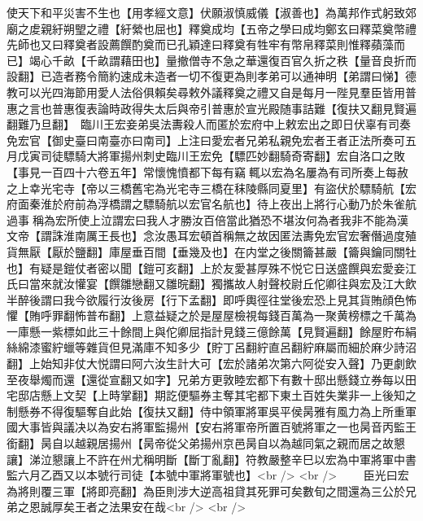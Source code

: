 使天下和平災害不生也【用孝經文意】伏願淑慎威儀【淑善也】為萬邦作式躬致郊廟之䖍親紆朔朢之禮【紆縈也屈也】釋奠成均【五帝之學曰成均鄭玄曰釋菜奠幣禮先師也又曰釋奠者設薦饌酌奠而已孔穎達曰釋奠有牲牢有幣帛釋菜則惟釋蘋藻而已】竭心千畝【千畝謂藉田也】量撤僧寺不急之華還復百官久折之秩【量音良折而設翻】已造者務令簡約速成未造者一切不復更為則孝弟可以通神明【弟謂曰悌】德教可以光四海節用愛人法俗俱賴矣尋敕外議釋奠之禮又自是每月一陛見羣臣皆用普惠之言也普惠復表論時政得失太后與帝引普惠於宣光殿随事詰難【復扶又翻見賢遍翻難乃旦翻】　臨川王宏妾弟吳法夀殺人而匿於宏府中上敕宏出之即日伏辜有司奏免宏官【御史臺曰南臺亦曰南司】上注曰愛宏者兄弟私親免宏者王者正法所奏可五月戊寅司徒驃騎大將軍揚州刺史臨川王宏免【驃匹妙翻騎奇寄翻】宏自洛口之敗【事見一百四十六卷五年】常懷愧憤都下每有竊輒以宏為名屢為有司所奏上每赦之上幸光宅寺【帝以三橋舊宅為光宅寺三橋在秣陵縣同夏里】有盜伏於驃騎航【宏府面秦淮於府前為浮橋謂之驃騎航以宏官名航也】待上夜出上將行心動乃於朱雀航過事稱為宏所使上泣謂宏曰我人才勝汝百倍當此猶恐不堪汝何為者我非不能為漢文帝【謂誅淮南厲王長也】念汝愚耳宏頓首稱無之故因匿法夀免宏官宏奢僭過度殖貨無厭【厭於鹽翻】庫屋垂百間【垂幾及也】在内堂之後關籥甚嚴【籥與鑰同關牡也】有疑是鎧仗者密以聞【鎧可亥翻】上於友愛甚厚殊不悦它日送盛饌與宏愛妾江氏曰當來就汝懽宴【饌雛戀翻又雛晥翻】獨攜故人射聲校尉丘佗卿往與宏及江大飲半醉後謂曰我今欲履行汝後房【行下孟翻】即呼輿徑往堂後宏恐上見其貨賄顔色怖懼【賄呼罪翻怖普布翻】上意益疑之於是屋屋檢視每錢百萬為一聚黄榜標之千萬為一庫懸一紫標如此三十餘間上與佗卿屈指計見錢三億餘萬【見賢遍翻】餘屋貯布絹絲綿漆蜜紵蠟等雜貨但見滿庫不知多少【貯丁呂翻紵直呂翻紵麻屬而細於麻少詩沼翻】上始知非仗大悦謂曰阿六汝生計大可【宏於諸弟次第六阿從安入聲】乃更劇飲至夜舉燭而還【還從宣翻又如字】兄弟方更敦睦宏都下有數十邸出懸錢立券每以田宅邸店懸上文契【上時掌翻】期訖便驅券主奪其宅都下東土百姓失業非一上後知之制懸券不得復驅奪自此始【復扶又翻】侍中領軍將軍吳平侯昺雅有風力為上所重軍國大事皆與議决以為安右將軍監揚州【安右將軍帝所置百號將軍之一也昺音丙監王銜翻】昺自以越親居揚州【昺帝從父弟揚州京邑昺自以為越同氣之親而居之故懇讓】涕泣懇讓上不許在州尤稱明斷【斷丁亂翻】符教嚴整辛巳以宏為中軍將軍中書監六月乙酉又以本號行司徒【本號中軍將軍號也】<br />
<br />
　　臣光曰宏為將則覆三軍【將即亮翻】為臣則涉大逆高祖貸其死罪可矣數旬之間還為三公於兄弟之恩誠厚矣王者之法果安在哉<br />
<br />
